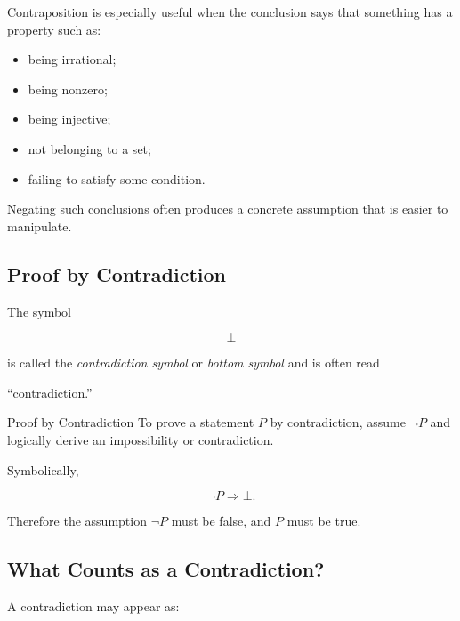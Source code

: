 Contraposition is especially useful when the conclusion says that something
has a property such as:

\begin{itemize}
    \item being irrational;
    \item being nonzero;
    \item being injective;
    \item not belonging to a set;
    \item failing to satisfy some condition.
\end{itemize}

Negating such conclusions often produces a concrete assumption that is easier
to manipulate.

\subsection{Proof by Contradiction}
\label{subsec:proof-contradiction}

The symbol

\[ \bot \]

is called the \emph{contradiction symbol} or \emph{bottom symbol} and is often
read

\begin{center}
``contradiction.''
\end{center}

\begin{definitionbox}{Proof by Contradiction}
To prove a statement \(P\) by contradiction, assume \(\neg P\) and logically
derive an impossibility or contradiction.
\end{definitionbox}

Symbolically,

\[ \neg P\Longrightarrow\bot. \]

Therefore the assumption \(\neg P\) must be false, and \(P\) must be true.

\subsection{What Counts as a Contradiction?}
\label{subsec:what-is-contradiction-proof}

A contradiction may appear as:

